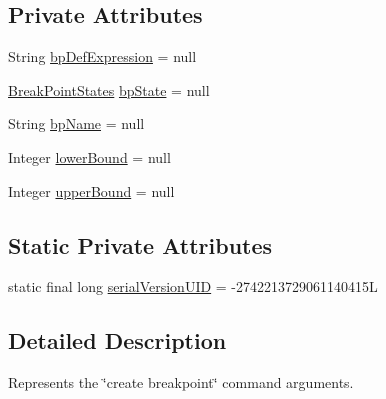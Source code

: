 \subsection*{Private Attributes}
\begin{DoxyCompactItemize}
\item 
String \hyperlink{classgov_1_1nasa_1_1jpf_1_1inspector_1_1client_1_1commands_1_1_cmd_breakpoint_create_1_1_console_breakpoint_creation_expression_a86a25e4d44f0ec17813cfc1a31c9d5b0}{bp\+Def\+Expression} = null
\item 
\hyperlink{enumgov_1_1nasa_1_1jpf_1_1inspector_1_1interfaces_1_1_break_point_states}{Break\+Point\+States} \hyperlink{classgov_1_1nasa_1_1jpf_1_1inspector_1_1client_1_1commands_1_1_cmd_breakpoint_create_1_1_console_breakpoint_creation_expression_adb662e43ca08e3ea6852f1af80502ff6}{bp\+State} = null
\item 
String \hyperlink{classgov_1_1nasa_1_1jpf_1_1inspector_1_1client_1_1commands_1_1_cmd_breakpoint_create_1_1_console_breakpoint_creation_expression_a46436f980b6fee9962610c2110c3b779}{bp\+Name} = null
\item 
Integer \hyperlink{classgov_1_1nasa_1_1jpf_1_1inspector_1_1client_1_1commands_1_1_cmd_breakpoint_create_1_1_console_breakpoint_creation_expression_abead53f102cf591c076f2b60dbb630cf}{lower\+Bound} = null
\item 
Integer \hyperlink{classgov_1_1nasa_1_1jpf_1_1inspector_1_1client_1_1commands_1_1_cmd_breakpoint_create_1_1_console_breakpoint_creation_expression_afc19a93fec068e4fc73750253deea264}{upper\+Bound} = null
\end{DoxyCompactItemize}
\subsection*{Static Private Attributes}
\begin{DoxyCompactItemize}
\item 
static final long \hyperlink{classgov_1_1nasa_1_1jpf_1_1inspector_1_1client_1_1commands_1_1_cmd_breakpoint_create_1_1_console_breakpoint_creation_expression_aa72aefa26c2de13e77a2b34d984e4e5f}{serial\+Version\+U\+ID} = -\/2742213729061140415L
\end{DoxyCompactItemize}


\subsection{Detailed Description}
Represents the \char`\"{}create breakpoint\char`\"{} command arguments. 

